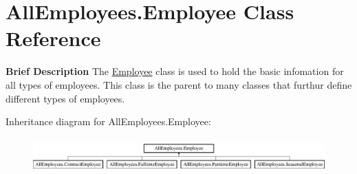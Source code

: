 \hypertarget{class_all_employees_1_1_employee}{}\section{All\+Employees.\+Employee Class Reference}
\label{class_all_employees_1_1_employee}


{\bfseries Brief Description} The \hyperlink{class_all_employees_1_1_employee}{Employee} class is used to hold the basic infomation for all types of employees. This class is the parent to many classes that furthur define different types of employees.  


Inheritance diagram for All\+Employees.\+Employee\+:\begin{figure}[H]
\begin{center}
\leavevmode
\includegraphics[height=1.352657cm]{class_all_employees_1_1_employee}
\end{center}
\end{figure}
